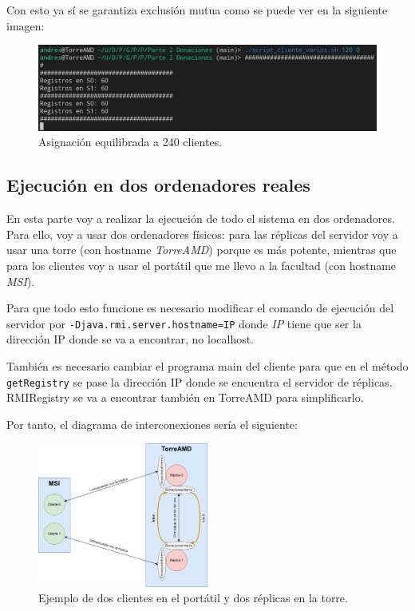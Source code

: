 \documentclass{article}
\begin{document}
Con esto ya sí se garantiza exclusión mutua como se puede ver en la siguiente imagen:

\begin{figure}[H]
    \centering
    \includegraphics[width=\textwidth]{imagenes/varios/correcto.png}
    \caption{Asignación equilibrada a 240 clientes.}
\end{figure}

\subsection{Ejecución en dos ordenadores reales}
En esta parte voy a realizar la ejecución de todo el sistema en dos ordenadores. Para ello, voy a usar dos ordenadores físicos: para las réplicas del servidor voy a usar una torre (con hostname \textit{TorreAMD}) porque es más potente, mientras que para los clientes voy a usar el portátil que me llevo a la facultad (con hostname \textit{MSI}).

\bigskip

Para que todo esto funcione es necesario modificar el comando de ejecución del servidor por \verb|-Djava.rmi.server.hostname=IP| donde \textit{IP} tiene que ser la dirección IP donde se va a encontrar, no localhost.

\bigskip

También es necesario cambiar el programa main del cliente para que en el método \verb|getRegistry| se pase la dirección IP donde se encuentra el servidor de réplicas. RMIRegistry se va a encontrar también en TorreAMD para simplificarlo.

\bigskip

Por tanto, el diagrama de interconexiones sería el siguiente:

\begin{figure}[H]
    \centering
    \includegraphics[width=0.5\textwidth]{imagenes/variosOrdenadores.png}
    \caption{Ejemplo de dos clientes en el portátil y dos réplicas en la torre.}
\end{figure}
\end{document}

